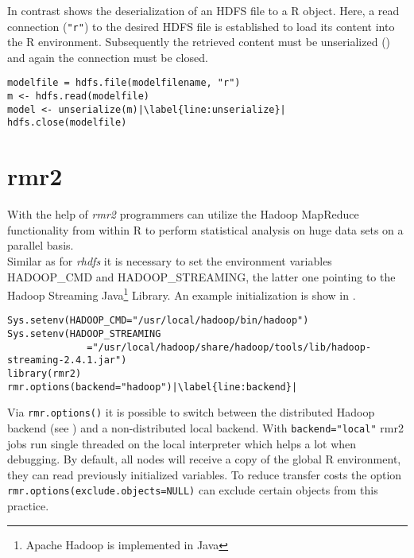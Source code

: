 In contrast  shows the deserialization of an HDFS file to a R object. Here, a read connection (\lstinline!"r"!) to the desired \ac{HDFS} file is established to load its content into the R environment. Subsequently the retrieved content must be unserialized () and again the connection must be closed.
\begin{lstlisting}[breaklines=true, caption=Deserialization of an exemplary R object~\cite{rhadoop}., escapechar=|, label={lst:RObjDeserialization}]
modelfile = hdfs.file(modelfilename, "r")
m <- hdfs.read(modelfile)
model <- unserialize(m)|\label{line:unserialize}|
hdfs.close(modelfile)
\end{lstlisting}



\section{rmr2}\label{sec:rmr2}
With the help of \emph{rmr2} programmers can utilize the Hadoop MapReduce functionality from within R to perform statistical analysis on huge data sets on a parallel basis.\\

Similar as for \emph{rhdfs} it is necessary to set the environment variables HADOOP\_CMD and HADOOP\_STREAMING, the latter one pointing to the Hadoop Streaming Java\footnote{Apache Hadoop is implemented in Java} Library. An example initialization is show in .
\begin{lstlisting}[breaklines=true, caption=Initialization of the rmr2 package., escapechar=|, label={lst:rmr2Init}]
Sys.setenv(HADOOP_CMD="/usr/local/hadoop/bin/hadoop")
Sys.setenv(HADOOP_STREAMING
              ="/usr/local/hadoop/share/hadoop/tools/lib/hadoop-streaming-2.4.1.jar")
library(rmr2)
rmr.options(backend="hadoop")|\label{line:backend}|
\end{lstlisting}

Via \lstinline!rmr.options()! it is possible to switch between the distributed Hadoop backend (see ) and a non-distributed local backend. With \lstinline!backend="local"! rmr2 jobs run single threaded on the local interpreter which helps a lot when debugging. By default, all nodes will receive a copy of the global R environment, \ie they can read previously initialized variables. To reduce transfer costs the option \lstinline!rmr.options(exclude.objects=NULL)! can exclude certain objects from this practice.\\


